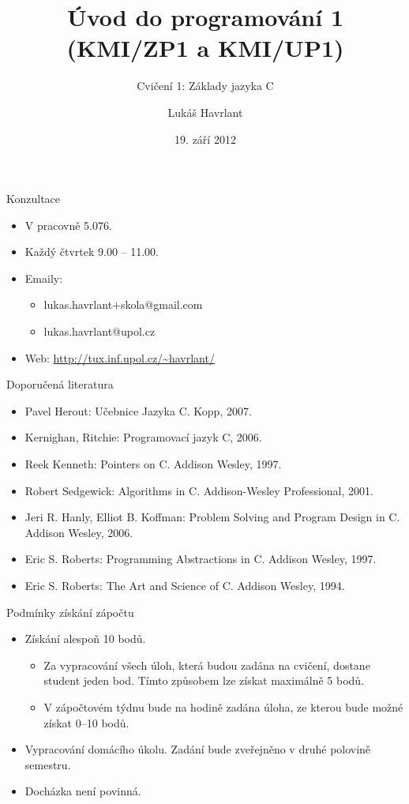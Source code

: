 \documentclass{beamer}
\title{Úvod do programování 1 (KMI/ZP1 a KMI/UP1)}
\subtitle{Cvičení 1: Základy jazyka C}
\author{Lukáš Havrlant}
\date{19. září 2012}
\institute{Univerzita Palackého}
\newenvironment{itemizex}%
  {\large \begin{itemize}%
    \setlength{\itemsep}{8pt}%
    \setlength{\parskip}{8pt}}%
  {\end{itemize}}
\begin{document}
\begin{frame}[t,plain]
\titlepage
\end{frame}


\begin{frame}[t,fragile]{Konzultace}
\begin{itemizex}
\item V pracovně 5.076.
\item Každý čtvrtek 9.00 -- 11.00. 
\item Emaily:
  \begin{itemizex}
    \item lukas.havrlant+skola@gmail.com
    \item lukas.havrlant@upol.cz
  \end{itemizex}
\item Web: \url{http://tux.inf.upol.cz/~havrlant/}
\end{itemizex}
\end{frame}


\begin{frame}[t,fragile]{Doporučená literatura}
\begin{itemize}
\item Pavel Herout: Učebnice Jazyka C. Kopp, 2007.
\item Kernighan, Ritchie: Programovací jazyk C, 2006.
\item Reek Kenneth: Pointers on C. Addison Wesley, 1997.
\item Robert Sedgewick: Algorithms in C. Addison-Wesley Professional, 2001.
\item Jeri R. Hanly, Elliot B. Koffman: Problem Solving and Program Design in C. Addison Wesley, 2006.
\item Eric S. Roberts: Programming Abstractions in C. Addison Wesley, 1997.
\item Eric S. Roberts: The Art and Science of C. Addison Wesley, 1994.
\end{itemize}
\end{frame}

\begin{frame}[t,fragile]{Podmínky získání zápočtu}
\begin{itemizex}
  \item Získání alespoň 10 bodů.
  \begin{itemizex}
    \item Za vypracování všech úloh, která budou zadána na cvičení, dostane student jeden bod. Tímto způsobem lze získat maximálně 5 bodů.
    \item V zápočtovém týdnu bude na hodině zadána úloha, ze kterou bude možné získat 0--10 bodů. 
  \end{itemizex}
  \item Vypracování domácího úkolu. Zadání bude zveřejněno v druhé polovině semestru. 
  \item Docházka není povinná.
\end{itemizex}
\end{frame}
\end{document}
